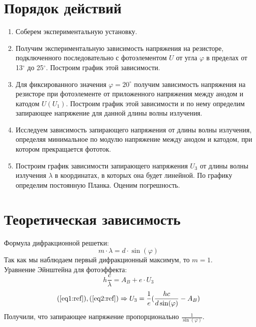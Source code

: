 \documentclass[12pt]{article}
\begin{document}
	\section{Порядок действий}
	\begin{enumerate}
		\item
		Соберем экспериментальную установку.
		\item
		Получим экспериментальную зависимость напряжения на резисторе, подключенного последовательно с фотоэлементом $U$ от угла $\varphi$ в пределах от 13$^\circ$ до 25$^\circ$. Построим график этой зависимости.
		\item
		Для фиксированного значения $\varphi=20^\circ$ получим зависимость напряжения на резисторе при фотоэлементе от приложенного напряжения между анодом и катодом $U(U_1)$. Построим график этой зависимости и по нему определим запирающее напряжение для данной длины волны излучения.
		\item
		Исследуем зависимость запирающего напряжения от длины волны излучения, определяя минимальное по модулю напряжение между анодом	и катодом, при котором прекращается фототок.
		\item
		Построим график зависимости запирающего напряжения $U_{3}$ от длины волны излучения $\lambda$ в координатах, в которых она будет линейной. По графику определим постоянную Планка. Оценим погрешность.
	\end{enumerate}
	\section{Теоретическая зависимость}
	Формула дифракционной решетки:
	\[
	m\cdot\lambda=d\cdot\sin(\varphi)
	\label{eq1:ref}
	\]
	Так как мы наблюдаем первый дифракционный максимум, то $m=1$.\\
	Уравнение Эйнштейна для фотоэффекта:
	\[
	h\frac{c}{\lambda} = A_B + e\cdot U_3
	\label{eq2:ref}
	\]
	\[
	\displaystyle
	(\ref{eq1:ref}), (\ref{eq2:ref}) \Rightarrow 
	U_3=\frac{1}{e}(\frac{hc}{d\sin(\varphi)}-A_B)
	\label{eq3:ref}
	\]
	Получили, что запирающее напряжение пропорционально $\displaystyle\frac{1}{\sin(\varphi)}$.
\end{document}
